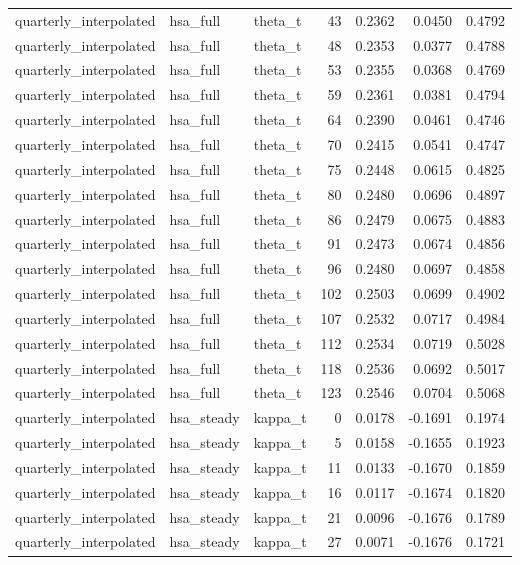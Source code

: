 \begin{tabular}{lllrrrr}
quarterly\_interpolated & hsa\_full & theta\_t & 43 & 0.2362 & 0.0450 & 0.4792 \\
quarterly\_interpolated & hsa\_full & theta\_t & 48 & 0.2353 & 0.0377 & 0.4788 \\
quarterly\_interpolated & hsa\_full & theta\_t & 53 & 0.2355 & 0.0368 & 0.4769 \\
quarterly\_interpolated & hsa\_full & theta\_t & 59 & 0.2361 & 0.0381 & 0.4794 \\
quarterly\_interpolated & hsa\_full & theta\_t & 64 & 0.2390 & 0.0461 & 0.4746 \\
quarterly\_interpolated & hsa\_full & theta\_t & 70 & 0.2415 & 0.0541 & 0.4747 \\
quarterly\_interpolated & hsa\_full & theta\_t & 75 & 0.2448 & 0.0615 & 0.4825 \\
quarterly\_interpolated & hsa\_full & theta\_t & 80 & 0.2480 & 0.0696 & 0.4897 \\
quarterly\_interpolated & hsa\_full & theta\_t & 86 & 0.2479 & 0.0675 & 0.4883 \\
quarterly\_interpolated & hsa\_full & theta\_t & 91 & 0.2473 & 0.0674 & 0.4856 \\
quarterly\_interpolated & hsa\_full & theta\_t & 96 & 0.2480 & 0.0697 & 0.4858 \\
quarterly\_interpolated & hsa\_full & theta\_t & 102 & 0.2503 & 0.0699 & 0.4902 \\
quarterly\_interpolated & hsa\_full & theta\_t & 107 & 0.2532 & 0.0717 & 0.4984 \\
quarterly\_interpolated & hsa\_full & theta\_t & 112 & 0.2534 & 0.0719 & 0.5028 \\
quarterly\_interpolated & hsa\_full & theta\_t & 118 & 0.2536 & 0.0692 & 0.5017 \\
quarterly\_interpolated & hsa\_full & theta\_t & 123 & 0.2546 & 0.0704 & 0.5068 \\
quarterly\_interpolated & hsa\_steady & kappa\_t & 0 & 0.0178 & -0.1691 & 0.1974 \\
quarterly\_interpolated & hsa\_steady & kappa\_t & 5 & 0.0158 & -0.1655 & 0.1923 \\
quarterly\_interpolated & hsa\_steady & kappa\_t & 11 & 0.0133 & -0.1670 & 0.1859 \\
quarterly\_interpolated & hsa\_steady & kappa\_t & 16 & 0.0117 & -0.1674 & 0.1820 \\
quarterly\_interpolated & hsa\_steady & kappa\_t & 21 & 0.0096 & -0.1676 & 0.1789 \\
quarterly\_interpolated & hsa\_steady & kappa\_t & 27 & 0.0071 & -0.1676 & 0.1721 \\

\end{tabular}
